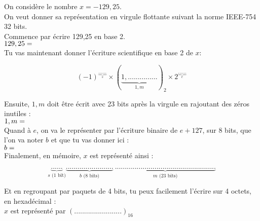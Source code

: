 \documentclass[12pt,a4paper,firamath]{nsi}
\begin{document}
\maketitle
On considère le nombre $x=-129,25$.\\

On veut donner sa représentation en virgule flottante suivant la norme IEEE-754 32 bits.\\

Commence par écrire 129,25 en base 2.\\

$129,25 =\dotfill$\\

Tu vas maintenant donner l'écriture scientifique en base 2 de $x$:\LARGE

	$$(-1)^{\underbrace{......}_s}\times \left(\underbrace{1,...............}_{1,m}\right)_2\times 2^{\underbrace{......}_{e}}$$\normalsize


Ensuite, $1,m$ doit être écrit avec 23 bits après la virgule en rajoutant des zéros inutiles :\\


$1,m=\dotfill$\\


Quand à $e$, on va le représenter par l'écriture binaire de $e+127$, sur 8 bits, que l'on va noter $b$ et que tu vas donner ici :\\

$b = \dotfill$\\

Finalement, en mémoire, $x$ est représenté ainsi :

\LARGE
$$\underbrace{......}_{s\text{ (1 bit)}}\underbrace{........................}_{b \text{ (8 bits)}}\ \underbrace{...................................................}_{m \text{ (23 bits)}}$$

\normalsize
Et en regroupant par paquets de 4 bits, tu peux facilement l'écrire sur 4 octets, en hexadécimal :\\

$x$ est représenté par $\left(........................\right)_{16}$
\end{document}
